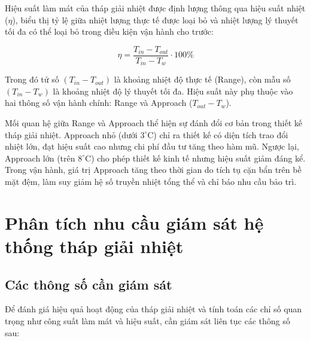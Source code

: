 \documentclass[../main.tex]{subfiles}
\begin{document}
Hiệu suất làm mát của tháp giải nhiệt được định lượng thông qua hiệu suất nhiệt ($\eta$), biểu thị tỷ lệ giữa nhiệt lượng thực tế được loại bỏ và nhiệt lượng lý thuyết tối đa có thể loại bỏ trong điều kiện vận hành cho trước:

\begin{equation}
    \eta = \frac{T_{in} - T_{out}}{T_{in} - T_w} \cdot 100\%
\end{equation}

Trong đó tử số $(T_{in} - T_{out})$ là khoảng nhiệt độ thực tế (Range), còn mẫu số $(T_{in} - T_w)$ là khoảng nhiệt độ lý thuyết tối đa. Hiệu suất này phụ thuộc vào hai thông số vận hành chính: Range và Approach ($T_{out} - T_w$).

Mối quan hệ giữa Range và Approach thể hiện sự đánh đổi cơ bản trong thiết kế tháp giải nhiệt. Approach nhỏ (dưới $3^\circ\mathrm{C}$) chỉ ra thiết kế có diện tích trao đổi nhiệt lớn, đạt hiệu suất cao nhưng chi phí đầu tư tăng theo hàm mũ. Ngược lại, Approach lớn (trên $8^\circ\mathrm{C}$) cho phép thiết kế kinh tế nhưng hiệu suất giảm đáng kể. Trong vận hành, giá trị Approach tăng theo thời gian do tích tụ cặn bẩn trên bề mặt đệm, làm suy giảm hệ số truyền nhiệt tổng thể và chỉ báo nhu cầu bảo trì.

\section{Phân tích nhu cầu giám sát hệ thống tháp giải nhiệt}
\label{sec:monitoring_requirements}

\subsection{Các thông số cần giám sát}
\label{sec:parameters_monitoring}

Để đánh giá hiệu quả hoạt động của tháp giải nhiệt và tính toán các chỉ số quan trọng như công suất làm mát và hiệu suất, cần giám sát liên tục các thông số sau:
\end{document}
